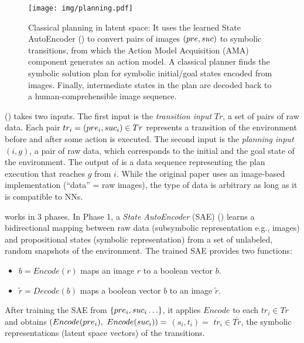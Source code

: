 \begin{figure}[tb]
 \centering
 \texttt{[image: img/planning.pdf]}
 \caption{Classical planning in latent space:
It uses the learned State AutoEncoder () to convert pairs of images $(pre,suc)$ to symbolic transitions,
 from which the Action Model Acquisition (AMA) component generates an action model.
A classical planner finds the symbolic solution plan for symbolic initial/goal states encoded from images.
Finally, intermediate states in the plan are decoded back to a human-comprehensible image sequence.}
\label{fig:overview}
\end{figure}

\latentplanner () takes two inputs.
The first input is the \emph{transition input} $Tr$, a set of pairs of raw data.
Each pair $tr_i=(pre_i, suc_i) \in Tr$ represents a transition of the environment before and after some action is executed.
The second input is the \emph{planning input} $(i, g)$, a pair of raw data, which corresponds to the initial and the goal state of the environment.
The output of \latentplanner is a data sequence representing the plan execution that reaches $g$ from $i$.
While the original paper uses an image-based implementation (``data'' = raw images),
the type of data is arbitrary as long as it is compatible to NNs.


\latentplanner works in 3 phases.
In Phase 1, a \emph{State AutoEncoder} (SAE) () learns a bidirectional mapping between raw data (subsymbolic representation e.g., images)
 and propositional states (symbolic representation) from a set of unlabeled, random snapshots of the environment.
The trained SAE provides two functions:
\begin{itemize} %
\setlength{\itemsep}{-0.3em}
\item $b=Encode(r)$ maps an image  $r$ to a boolean vector $b$.
\item $\tilde{r}=Decode(b)$ maps a boolean vector $b$ to an image $\tilde{r}$.
\end{itemize}
After training the SAE from ${\left\{pre_i, suc_i\ldots\right\}}$,
it applies $Encode$ to each $tr_i \in Tr$ and obtains $(Encode(pre_i),$ $Encode(suc_i))=$ $(s_i,t_i)=$ $\overline{tr}_i\in \overline{Tr}$,
the symbolic representations (latent space vectors) of the transitions.


